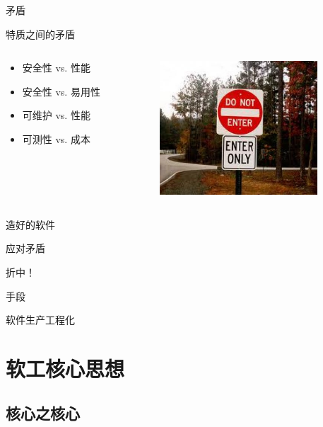 \documentclass[]{beamer}
\begin{document}
\begin{frame}{矛盾}
  \begin{block}{特质之间的矛盾}
    \begin{columns}
      \begin{column}{4cm}
        \begin{itemize}
          \item 安全性 vs. 性能
          \item 安全性 vs. 易用性
          \item 可维护 vs. 性能
          \item 可测性 vs. 成本
        \end{itemize}
      \end{column}
      \begin{column}{6cm}
        \includegraphics[height=5cm]{contradiction.jpg}
      \end{column}
    \end{columns}
  \end{block}
\end{frame}

\begin{frame}{造好的软件}
  \begin{alertblock}{应对矛盾}
    \begin{center}
      \Huge 折中！
    \end{center}
  \end{alertblock}
  \pause
  \begin{block}{手段}
    \begin{center}
      \Huge 软件生产工程化
    \end{center}
  \end{block}
\end{frame}

\section{软工核心思想}

\subsection{核心之核心}
\end{document}
